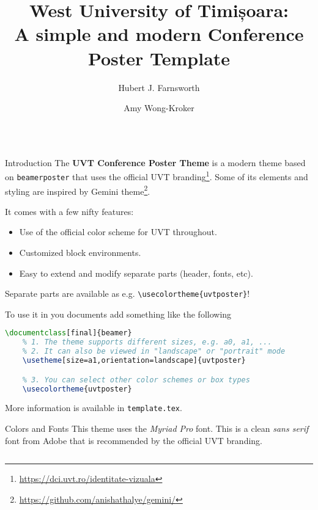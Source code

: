 \documentclass[final]{beamer}
\title{West University of Timișoara: \\ A simple and modern Conference Poster Template}
\author{Hubert J. Farnsworth\inst{1} \and Amy Wong-Kroker\inst{2}}
\institute[shortinst]{\inst{1} West University of Timișoara \quad \inst{2} Mars University}
\begin{document}
\begin{frame}[fragile]
\begin{columns}[t]

\separatorcolumn
\begin{column}{0.3\paperwidth}

\begin{block}{Introduction}
    The \textbf{UVT Conference Poster Theme} is a modern theme based on
    \texttt{beamerposter} that uses the official
    \textcolor{UVTLightBlue}{UVT branding}\footnote{\url{https://dci.uvt.ro/identitate-vizuala}}. Some
    of its elements and styling are inspired by \textcolor{UVTLightBlue}{Gemini}
    theme\footnote{\url{https://github.com/anishathalye/gemini/}}.

    \bigskip
    It comes with a few nifty features:
    \begin{itemize}
        \item Use of the official color scheme for UVT throughout.
        \item Customized block environments.
        \item Easy to extend and modify separate parts (header, fonts, etc).
    \end{itemize}

    \bigskip
    Separate parts are available as e.g. \texttt{\textbackslash usecolortheme\{uvtposter\}}!
    \bigskip

    To use it in you documents add something like the following

    \begin{center}
    \begin{lstlisting}[language=TeX]
    \documentclass[final]{beamer}
    % 1. The theme supports different sizes, e.g. a0, a1, ...
    % 2. It can also be viewed in "landscape" or "portrait" mode
    \usetheme[size=a1,orientation=landscape]{uvtposter}

    % 3. You can select other color schemes or box types
    \usecolortheme{uvtposter}
    \end{lstlisting}
    \end{center}

    \bigskip
    More information is available in \texttt{template.tex}.
    \bigskip
\end{block}

\begin{block}{Colors and Fonts}
    This theme uses the \emph{Myriad Pro} font. This is a clean \emph{sans serif}
    font from Adobe that is recommended by the official UVT branding.


\end{block}
\end{column}
\end{columns}
\end{frame}
\end{document}
